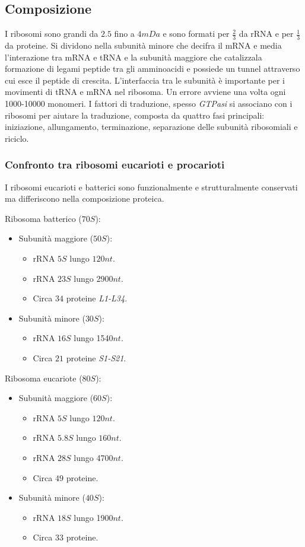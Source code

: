 \subsection{Composizione}
I ribosomi sono grandi da $2.5$ fino a $4mDa$ e sono formati per $\frac{2}{3}$ da rRNA e per $\frac{1}{3}$ da proteine. Si dividono nella subunit\`a minore che decifra il mRNA e media l'interazione
tra mRNA e tRNA e la subunit\`a maggiore che catalizzala formazione di legami peptide tra gli amminoacidi e possiede un tunnel attraverso cui esce il peptide di crescita. L'interfaccia tra le 
subunit\`a \`e importante per i movimenti di tRNA e mRNA nel ribosoma. Un errore avviene una volta ogni \num{1000}-\num{10000} monomeri. I fattori di traduzione, spesso \emph{GTPasi} si associano 
con i ribosomi per aiutare la traduzione, composta da quattro fasi principali: iniziazione, allungamento, terminazione, separazione delle subunit\`a ribosomiali e riciclo. 
\subsubsection{Confronto tra ribosomi eucarioti e procarioti}
I ribosomi eucarioti e batterici sono funzionalmente e strutturalmente conservati ma differiscono nella composizione proteica.
\begin{multicols}{2}
	Ribosoma batterico ($70S$):
	\begin{itemize}
		\item Subunit\`a maggiore ($50S$):
			\begin{itemize}
				\item rRNA $5S$ lungo $120nt$.
				\item rRNA $23S$ lungo \num{2900}$nt$.
				\item Circa $34$ proteine \emph{L1-L34}.
			\end{itemize}
		\item Subunit\`a minore ($30S$):
			\begin{itemize}
				\item rRNA $16S$ lungo \num{1540}$nt$.
				\item Circa $21$ proteine \emph{S1-S21}.
			\end{itemize}
	\end{itemize}
	\columnbreak
	Ribosoma eucariote ($80S$):
	\begin{itemize}
		\item Subunit\`a maggiore ($60S$):
			\begin{itemize}
				\item rRNA $5S$ lungo $120nt$.
				\item rRNA $5.8S$ lungo $160nt$.
				\item rRNA $28S$ lungo \num{4700}$nt$.
				\item Circa $49$ proteine.
			\end{itemize}
		\item Subunit\`a minore ($40S$):
			\begin{itemize}
				\item rRNA $18S$ lungo \num{1900}$nt$.
				\item Circa $33$ proteine.
			\end{itemize}
	\end{itemize}
\end{multicols}

